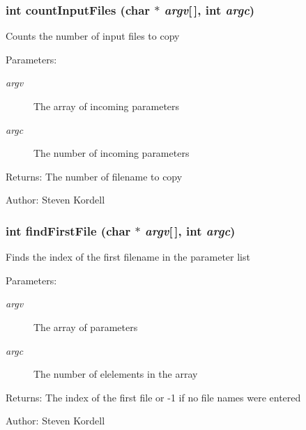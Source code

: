 \subsubsection{\setlength{\rightskip}{0pt plus 5cm}int count\-Input\-Files (char $\ast$ {\em argv}[$\,$], int {\em argc})}\label{cptest2_8c_56206b76b9bc45ecaa5d83982d1c0c96}


Counts the number of input files to copy \begin{Desc}
\item[Parameters:]
\begin{description}
\item[{\em argv}]The array of incoming parameters \item[{\em argc}]The number of incoming parameters \end{description}
\end{Desc}
\begin{Desc}
\item[Returns:]The number of filename to copy \end{Desc}
\begin{Desc}
\item[Author:]Steven Kordell \end{Desc}
\subsubsection{\setlength{\rightskip}{0pt plus 5cm}int find\-First\-File (char $\ast$ {\em argv}[$\,$], int {\em argc})}\label{cptest2_8c_6c6789fe00d548b123a744801977f57f}


Finds the index of the first filename in the parameter list \begin{Desc}
\item[Parameters:]
\begin{description}
\item[{\em argv}]The array of parameters \item[{\em argc}]The number of elelements in the array \end{description}
\end{Desc}
\begin{Desc}
\item[Returns:]The index of the first file or -1 if no file names were entered \end{Desc}
\begin{Desc}
\item[Author:]Steven Kordell \end{Desc}
